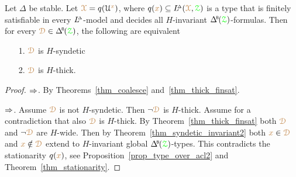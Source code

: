 

\begin{proposition}\label{prop_stable_syndeticiffthick}
  Let $\Delta$ be stable.
  Let ${\color{brown}\EuScript X}=q(\EuScript U^{\color{brown} x})$, where $q({\color{brown} x})\subseteq L\kern-.5ex^{\scriptscriptstyle\Delta}({\color{brown}\EuScript X},{\color{green}\EuScript Z})$ is a type that is finitely satisfiable in every $L\kern-.5ex^{\scriptscriptstyle\Delta}$-model and decides all $H$-invariant $\BDelta(\grZ)$-formulas.
  Then for every $\mrD\in\BDelta(\grZ)$, the following are equivalent
  \begin{itemize}
    \item[1.] ${\color{brown}\EuScript D}$ is $H$-syndetic
    \item[2.] ${\color{brown}\EuScript D}$ is $H$-thick.
  \end{itemize}\smallskip
\end{proposition}

\begin{proof}
  $\Rightarrow$.
  By Theorems~\ref{thm_coalesce} and~\ref{thm_thick_finsat}.

  $\Rightarrow$.
  Assume ${\color{brown}\EuScript D}$ is not $H$-syndetic.
  Then $\neg{\color{brown}\EuScript D}$ is $H$-thick.
  Assume for a contradiction that also ${\color{brown}\EuScript D}$ is $H$-thick.
  By Theorem~\ref{thm_thick_finsat} both ${\color{brown}\EuScript D}$ and $\neg{\color{brown}\EuScript D}$ are $H$-wide.
  Then by Theorem~\ref{thm_syndetic_invariant2} both ${\color{brown} x}\in{\color{brown}\EuScript D}$ and ${\color{brown} x}\notin{\color{brown}\EuScript D}$ extend to $H$-invariant global $\BDelta(\grZ)$-types.
  This contradicts the stationarity $q({\color{brown} x})$, see Proposition~\ref{prop_type_over_acl2} and Theorem~\ref{thm_stationarity}.
\end{proof}

